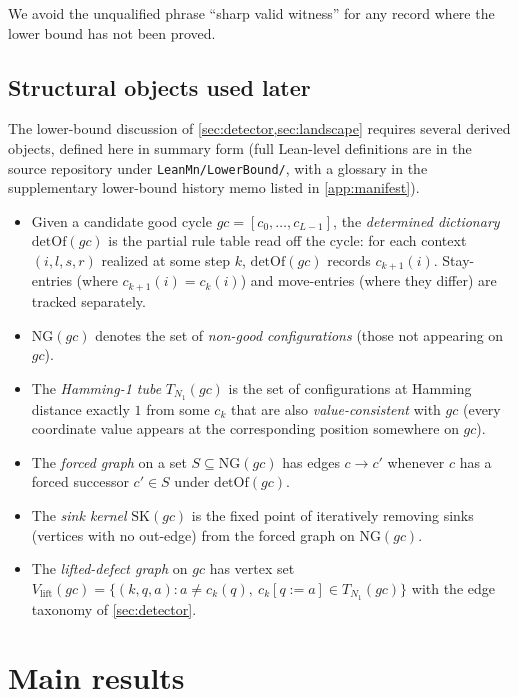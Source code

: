 \documentclass[11pt,a4paper]{article}
\theoremstyle{plain}
\theoremstyle{definition}
\newcommand{\NGset}{\mathrm{NG}}
\newcommand{\SK}{\mathrm{SK}}
\newcommand{\detOf}{\mathrm{detOf}}
\begin{document}
We avoid the unqualified phrase ``sharp valid witness'' for any record
where the lower bound has not been proved.

\subsection{Structural objects used later}\label{sec:prelim-objects}

The lower-bound discussion of \cref{sec:detector,sec:landscape} requires
several derived objects, defined here in summary form (full Lean-level
definitions are in the source repository under
\texttt{LeanMn/LowerBound/}, with a glossary in the supplementary
lower-bound history memo listed in \cref{app:manifest}).

\begin{itemize}[leftmargin=*]
\item Given a candidate good cycle $gc = [c_0, \ldots, c_{L-1}]$, the
\emph{determined dictionary} $\detOf(gc)$ is the partial rule table read
off the cycle: for each context $(i, l, s, r)$ realized at some step
$k$, $\detOf(gc)$ records $c_{k+1}(i)$.  Stay-entries (where $c_{k+1}(i) = c_k(i)$)
and move-entries (where they differ) are tracked separately.
\item $\NGset(gc)$ denotes the set of \emph{non-good configurations}
(those not appearing on $gc$).
\item The \emph{Hamming-1 tube} $T_{N_1}(gc)$ is the set of
configurations at Hamming distance exactly $1$ from some
$c_k$ that are also \emph{value-consistent} with $gc$
(every coordinate value appears at the corresponding position somewhere on $gc$).
\item The \emph{forced graph} on a set $S \subseteq \NGset(gc)$ has edges
$c \to c'$ whenever $c$ has a forced successor $c' \in S$ under
$\detOf(gc)$.
\item The \emph{sink kernel} $\SK(gc)$ is the fixed point of iteratively
removing sinks (vertices with no out-edge) from the forced graph on
$\NGset(gc)$.
\item The \emph{lifted-defect graph} on $gc$ has vertex set
$V_{\mathrm{lift}}(gc) = \{(k, q, a) : a \ne c_k(q),\ c_k[q := a] \in T_{N_1}(gc)\}$
with the edge taxonomy of \cref{sec:detector}.
\end{itemize}

\section{Main results}\label{sec:main}
\end{document}
